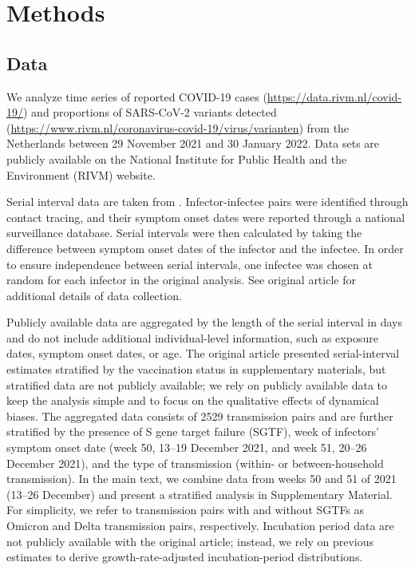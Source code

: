 \documentclass[12pt]{article}
\begin{document}
\section{Methods}

\subsection{Data}

We analyze time series of reported COVID-19 cases (\url{https://data.rivm.nl/covid-19/}) and proportions of SARS-CoV-2 variants detected (\url{https://www.rivm.nl/coronavirus-covid-19/virus/varianten}) from the Netherlands between 29 November 2021 and 30 January 2022.
Data sets are publicly available on the National Institute for Public Health and the Environment (RIVM) website.

Serial interval data are taken from \cite{backer2021omicron}.
Infector-infectee pairs were identified through contact tracing, and their symptom onset dates were reported through a national surveillance database. 
Serial intervals were then calculated by taking the difference between symptom onset dates of the infector and the infectee.
In order to ensure independence between serial intervals, one infectee was chosen at random for each infector in the original analysis.
See original article for additional details of data collection.

Publicly available data are aggregated by the length of the serial interval in days and do not include additional individual-level information, such as exposure dates, symptom onset dates, or age.
The original article presented serial-interval estimates stratified by the vaccination status in supplementary materials, but stratified data are not publicly available; we rely on publicly available data to keep the analysis simple and to focus on the qualitative effects of dynamical biases.
The aggregated data consists of 2529 transmission pairs and are further stratified by the presence of S gene target failure (SGTF), week of infectors' symptom onset date (week 50, 13--19 December 2021, and week 51, 20--26 December 2021), and the type of transmission (within- or between-household transmission).
In the main text, we combine data from weeks 50 and 51 of 2021 (13--26 December) and present a stratified analysis in Supplementary Material.
For simplicity, we refer to transmission pairs with and without SGTFs as Omicron and Delta transmission pairs, respectively.
Incubation period data are not publicly available with the original article; instead, we rely on previous estimates \cite{backer2021omicron} to derive growth-rate-adjusted incubation-period distributions.
\end{document}
